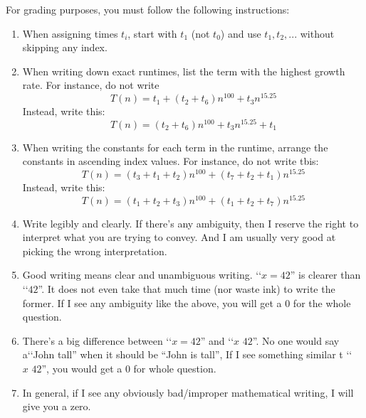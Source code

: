 For grading purposes, you must follow the following instructions:
\begin{enumerate}[nosep]
\item When assigning times $t_i$, start with $t_1$ (not $t_0$)
and use $t_1, t_2, ...$ without skipping any index.
\item When writing down exact runtimes, list the term with the highest
growth rate. For instance, do not write
\[
T(n) = t_1 + (t_2 + t_6)n^{100} + t_3 n^{15.25}
\]
Instead, write this:
\[
T(n) = (t_2 + t_6)n^{100} + t_3 n^{15.25} + t_1 
\]
\item When writing the constants for each term in the runtime, arrange the
constants in ascending index values. For instance, do not write tbis:
\[
T(n) = (t_3 + t_1 + t_2) n^{100} + (t_7 + t_2 + t_1) n^{15.25}
\]
Instead, write this:
\[
T(n) = (t_1 + t_2 + t_3) n^{100} + (t_1 + t_2 + t_7) n^{15.25}
\]
\item Write legibly and clearly. If there's any ambiguity, then I
reserve the right to interpret what you are trying to convey.
And I am usually very good at picking the wrong interpretation.
\item Good writing means clear and unambiguous writing.
\lq\lq $x = 42$'' is clearer than \lq\lq $42$''.
It does not even take that much time (nor waste ink) to write the former.
If I see any ambiguity like the above, you will get a 0 for the whole question.

\item
There's a big difference between \lq\lq $x = 42$'' and \lq\lq $x \, \, 42$''.
No one would say
a\lq\lq John tall'' when it should be
``John is tall'',
If I see something similar t
\lq\lq $x \, \, 42$'', you would get a 0 for whole question.

\item In general, if I see any obviously bad/improper mathematical writing,
I will give you a zero.

\end{enumerate}
